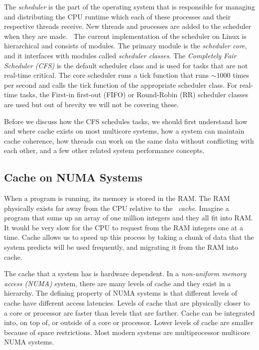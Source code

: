 \documentclass{sig-alternate}
\begin{document}
The \emph{scheduler} is the part of the operating system that is responsible for managing and distributing the CPU runtime which each of these processes and their respective threads receive. New threads and processes are added to the scheduler when they are made.~\cite{Lozi:2016} The current implementation of the scheduler on Linux is hierarchical and consists of modules. The primary module is the \emph{scheduler core}, and it interfaces with modules called \emph{scheduler classes}. The \emph{Completely Fair Scheduler (CFS)} is the default scheduler class and is used for tasks that are not real-time critical. The core scheduler runs a tick function that runs $\sim1000$ times per second and calls the tick function of the appropriate scheduler class. For real-time tasks, the First-in first-out (FIFO) or Round-Robin (RR) scheduler classes are used but out of brevity we will not be covering these.~\cite{SchedThesis}

Before we discuss how the CFS schedules tasks, we should first understand how and where cache exists on most multicore systems, how a system can maintain cache coherence, how threads can work on the same data without conflicting with each other, and a few other related system performance concepts.

\subsection{Cache on NUMA Systems}
\label{sec:cache}

When a program is running, its memory is stored in the RAM. The RAM physically exists far away from the CPU relative to the ~\emph{cache}. Imagine a program that sums up an array of one million integers and they all fit into RAM. It would be very slow for the CPU to request from the RAM integers one at a time. Cache allows us to speed up this process by taking a chunk of data that the system predicts will be used frequently, and migrating it from the RAM into cache.

The cache that a system has is hardware dependent. In a \emph{non-uniform memory access (NUMA)} system, there are many levels of cache and they exist in a hierarchy. The defining property of NUMA systems is that different levels of cache have different access latencies.  Levels of cache that are physically closer to a core or processor are faster than levels that are farther. Cache can be integrated into, on top of, or outside of a core or processor. Lower levels of cache are smaller because of space restrictions. Most modern systems are multiprocessor multicore NUMA systems.
\end{document}
